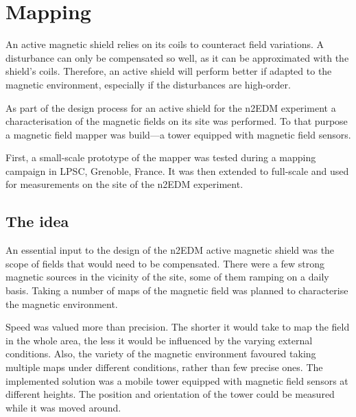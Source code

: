 \chapter{Mapping}
\label{ch:mapping}
An active magnetic shield relies on its coils to counteract field variations. A disturbance can only be compensated so well, as it can be approximated with the shield's coils. Therefore, an active shield will perform better if adapted to the magnetic environment, especially if the disturbances are high-order.

As part of the design process for an active shield for the n2EDM experiment a characterisation of the magnetic fields on its site was performed. To that purpose a magnetic field mapper was build---a tower equipped with magnetic field sensors.

First, a small-scale prototype of the mapper was tested during a mapping campaign in LPSC, Grenoble, France. It was then extended to full-scale and used for measurements on the site of the n2EDM experiment.




\section{The idea}
An essential input to the design of the n2EDM active magnetic shield was the scope of fields that would need to be compensated. There were a few strong magnetic sources in the vicinity of the site, some of them ramping on a daily basis. Taking a number of maps of the magnetic field was planned to characterise the magnetic environment.

Speed was valued more than precision. The shorter it would take to map the field in the whole area, the less it would be influenced by the varying external conditions. Also, the variety of the magnetic environment favoured taking multiple maps under different conditions, rather than few precise ones.
The implemented solution was a mobile tower equipped with magnetic field sensors at different heights. The position and orientation of the tower could be measured while it was moved around.


